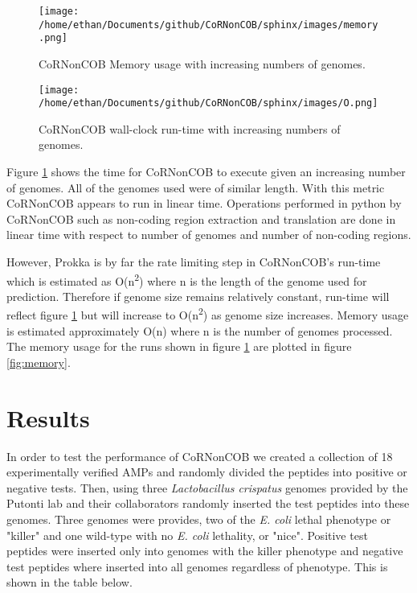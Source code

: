 \documentclass{article}
\begin{document}
\begin{figure}[H]
  \centering
  \begin{minipage}[b]{0.45\textwidth}
    \texttt{[image: /home/ethan/Documents/github/CoRNonCOB/sphinx/images/memory.png]}
    \caption{CoRNonCOB Memory usage with increasing numbers of genomes.}
    \label{fig:memory}
  \end{minipage}
  \hfill
  \begin{minipage}[b]{0.4\textwidth}
    \texttt{[image: /home/ethan/Documents/github/CoRNonCOB/sphinx/images/O.png]}
    \caption{CoRNonCOB wall-clock run-time with increasing numbers of genomes.}
    \label{fig:runtime}
  \end{minipage}
\end{figure}

Figure \ref{fig:runtime} shows the time for CoRNonCOB to execute given an increasing number of genomes. All of the genomes used were of similar length. With this metric CoRNonCOB appears to run in linear time. Operations performed in python by CoRNonCOB such as non-coding region extraction and translation are done in linear time with respect to number of genomes and number of non-coding regions. 



However, Prokka is by far the rate limiting step in CoRNonCOB’s run-time which is estimated as O(n\textsuperscript{2}) where n is the length of the genome used for prediction. Therefore if genome size remains relatively constant, run-time will reflect figure \ref{fig:runtime} but will increase to O(n\textsuperscript{2}) as genome size increases. Memory usage is estimated approximately O(n) where n is the number of genomes processed. The memory usage for the runs shown in figure \ref{fig:runtime} are plotted in figure \ref{fig:memory}.


\section{Results} 

In order to test the performance of CoRNonCOB we created a collection of 18 experimentally verified AMPs and randomly divided the peptides into positive or negative tests. Then, using three \emph{Lactobacillus crispatus} genomes provided by the Putonti lab and their collaborators randomly inserted the test peptides into these genomes. Three genomes were provides, two of the \emph{E. coli} lethal phenotype or "killer" and one wild-type with no \emph{E. coli} lethality, or "nice". Positive test peptides were inserted only into genomes with the killer phenotype and negative test peptides where inserted into all genomes regardless of phenotype. This is shown in the table below.
\end{document}
